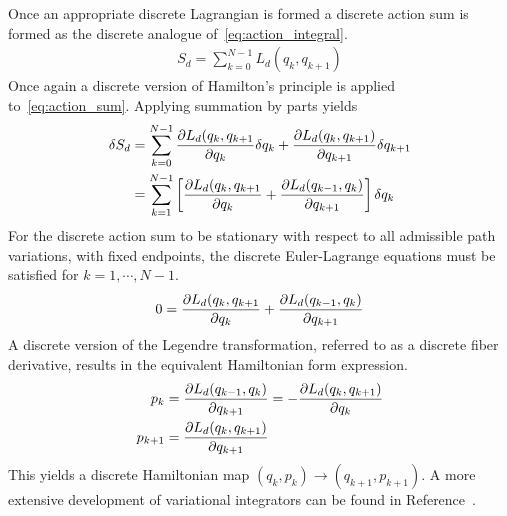 \documentclass[letterpaper, preprint, paper,11pt]{AAS}	%
\begin{document}
Once an appropriate discrete Lagrangian is formed a discrete action sum is formed as the discrete analogue of~\cref{eq:action_integral}.
\begin{align}\label{eq:action_sum}
	S_d = \sum_{k=0}^{N-1} L_d(q_k, q_{k+1})
\end{align}
Once again a discrete version of Hamilton's principle is applied to~\cref{eq:action_sum}.
Applying summation by parts yields
\begin{subequations}
\begin{align}\label{eq:dis_var_principle}
	\delta S_d &= \sum_{k=0}^{N-1} \deriv{L_d(q_k, q_{k+1}}{q_k} \delta q_k + \deriv{L_d(q_k, q_{k+1})}{q_{k+1}} \delta q_{k+1} \\
	&= \sum_{k=1}^{N-1} \bracket{ \deriv{L_d(q_k, q_{k+1}}{q_k} + \deriv{L_d(q_{k-1}, q_k)}{q_{k+1}}} \delta q_k
\end{align}
\end{subequations}
For the discrete action sum to be stationary with respect to all admissible path variations, with fixed endpoints, the discrete Euler-Lagrange equations must be satisfied for \( k = 1, \cdots, N-1 \).
\begin{align}\label{eq:discrete_euler-lagrange}
	0 = \deriv{L_d(q_k, q_{k+1}}{q_k} + \deriv{L_d(q_{k-1}, q_k)}{q_{k+1}}
\end{align}
A discrete version of the Legendre transformation, referred to as a discrete fiber derivative, results in the equivalent Hamiltonian form expression. 
\begin{subequations}\label{eq:discrete_legendre}
\begin{align}
	p_k &= \frac{\partial L_d(q_{k-1},q_k)}{\partial q_{k+1}} = - \frac{\partial L_d(q_k, q_{k+1})}{\partial q_k} \\
	p_{k+1} &= \frac{\partial L_d(q_k, q_{k+1})}{\partial q_{k+1}}
\end{align}
\end{subequations}
This yields a discrete Hamiltonian map \( (q_k, p_k) \to (q_{k+1}, p_{k+1}) \).
A more extensive development of variational integrators can be found in Reference~.
\end{document}
